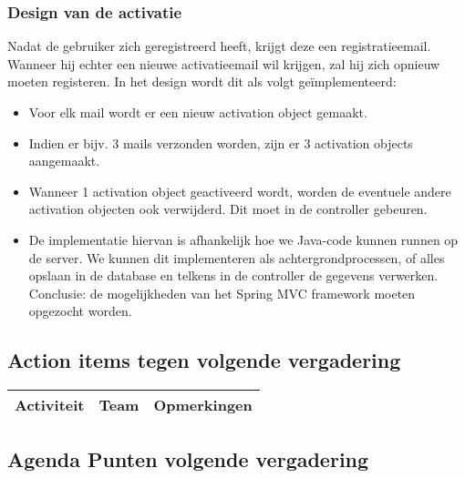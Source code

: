 \subsubsection{Design van de activatie}
Nadat de gebruiker zich geregistreerd heeft, krijgt deze een registratieemail. Wanneer hij echter een nieuwe activatieemail wil krijgen, zal hij zich opnieuw moeten registeren. In het design wordt dit als volgt ge\"{i}mplementeerd:
\begin{itemize}
	\item Voor elk mail wordt er een nieuw activation object gemaakt.
	\item Indien er bijv. 3 mails verzonden worden, zijn er 3 activation objects aangemaakt.
	\item Wanneer 1 activation object geactiveerd wordt, worden de eventuele andere activation objecten ook verwijderd. Dit moet in de controller gebeuren.
	\item De implementatie hiervan is afhankelijk hoe we Java-code kunnen runnen op de server. We kunnen dit implementeren als achtergrondprocessen, of alles opslaan in de database en telkens in de controller de gegevens verwerken. Conclusie: de mogelijkheden van het Spring MVC framework moeten opgezocht worden.
\end{itemize}


\subsection{Action items tegen volgende vergadering}
\begin{table} [H]
	\centering
	\begin{tabular} {l|l|l}
		\textbf{Activiteit} & \textbf{Team} & \textbf{Opmerkingen} \\
		
		\hline
	\end{tabular}
\end{table}

\subsection{Agenda Punten volgende vergadering}



